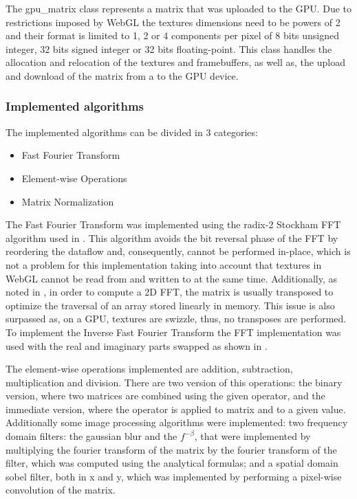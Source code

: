         The gpu\_matrix class represents a matrix that was uploaded to the GPU. Due to restrictions imposed by WebGL the textures dimensions need to be powers of 2 and their format is limited to 1, 2 or 4 components per pixel of 8 bits unsigned integer, 32 bits signed integer or 32 bits floating-point. This class handles the allocation and relocation of the textures and framebuffers, as well as, the upload and download of the matrix from a to the GPU device.
      
	  \subsubsection{Implemented algorithms}
	  
	    The implemented algorithms can be divided in 3 categories:
	    \begin{itemize}
	      \item Fast Fourier Transform
	      \item Element-wise Operations
	      \item Matrix Normalization
	    \end{itemize}
	    
	    The Fast Fourier Transform was implemented using the radix-2 Stockham FFT algorithm used in \cite{Lloyd2008}. This algorithm avoids the bit reversal phase of the FFT by reordering the dataflow and, consequently, cannot be performed in-place, which is not a problem for this implementation taking into account that textures in WebGL cannot be read from and written to at the same time. Additionally, as noted in \cite{Lloyd2008}, in order to compute a 2D FFT, the matrix is usually transposed to optimize the traversal of an array stored linearly in memory. This issue is also surpassed as, on a GPU, textures are swizzle, thus, no transposes are performed. 
	    To implement the Inverse Fast Fourier Transform the FFT implementation was used with the real and imaginary parts swapped as shown in \cite[p.450]{Lyons2004}.
	    
	    The element-wise operations implemented are addition, subtraction, multiplication and division. There are two version of this operations: the binary version, where two matrices are combined using the given operator, and the immediate version, where the operator is applied to matrix and to a given value. Additionally some image processing algorithms were implemented: two frequency domain filters: the gaussian blur and the $f^{-\beta}$, that were implemented by multiplying the fourier transform of the matrix by the fourier transform of the filter, which was computed using the analytical formulas; and a spatial domain sobel filter, both in x and y, which was implemented by performing a pixel-wise convolution of the matrix.
	    
